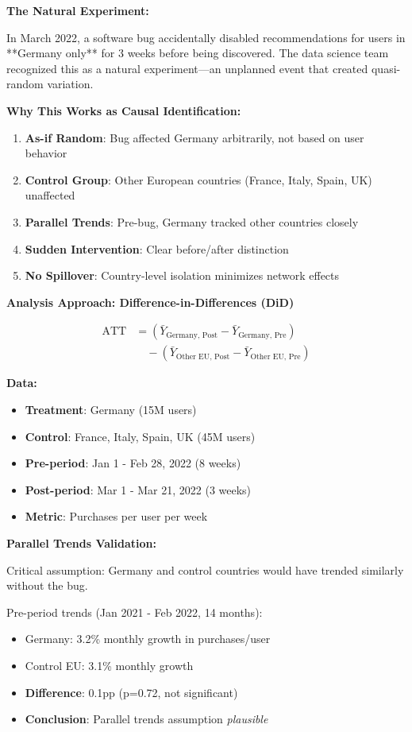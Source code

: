\textbf{The Natural Experiment:}

In March 2022, a software bug accidentally disabled recommendations for users in **Germany only** for 3 weeks before being discovered. The data science team recognized this as a natural experiment---an unplanned event that created quasi-random variation.

\textbf{Why This Works as Causal Identification:}

\begin{enumerate}
    \item \textbf{As-if Random}: Bug affected Germany arbitrarily, not based on user behavior
    \item \textbf{Control Group}: Other European countries (France, Italy, Spain, UK) unaffected
    \item \textbf{Parallel Trends}: Pre-bug, Germany tracked other countries closely
    \item \textbf{Sudden Intervention}: Clear before/after distinction
    \item \textbf{No Spillover}: Country-level isolation minimizes network effects
\end{enumerate}

\textbf{Analysis Approach: Difference-in-Differences (DiD)}

\begin{align*}
\text{ATT} &= (\bar{Y}_{\text{Germany, Post}} - \bar{Y}_{\text{Germany, Pre}}) \\
&\quad - (\bar{Y}_{\text{Other EU, Post}} - \bar{Y}_{\text{Other EU, Pre}})
\end{align*}

\textbf{Data:}
\begin{itemize}
    \item \textbf{Treatment}: Germany (15M users)
    \item \textbf{Control}: France, Italy, Spain, UK (45M users)
    \item \textbf{Pre-period}: Jan 1 - Feb 28, 2022 (8 weeks)
    \item \textbf{Post-period}: Mar 1 - Mar 21, 2022 (3 weeks)
    \item \textbf{Metric}: Purchases per user per week
\end{itemize}

\textbf{Parallel Trends Validation:}

Critical assumption: Germany and control countries would have trended similarly without the bug.

Pre-period trends (Jan 2021 - Feb 2022, 14 months):
\begin{itemize}
    \item Germany: 3.2\% monthly growth in purchases/user
    \item Control EU: 3.1\% monthly growth
    \item \textbf{Difference}: 0.1pp (p=0.72, not significant)
    \item \textbf{Conclusion}: Parallel trends assumption \textit{plausible}
\end{itemize}

